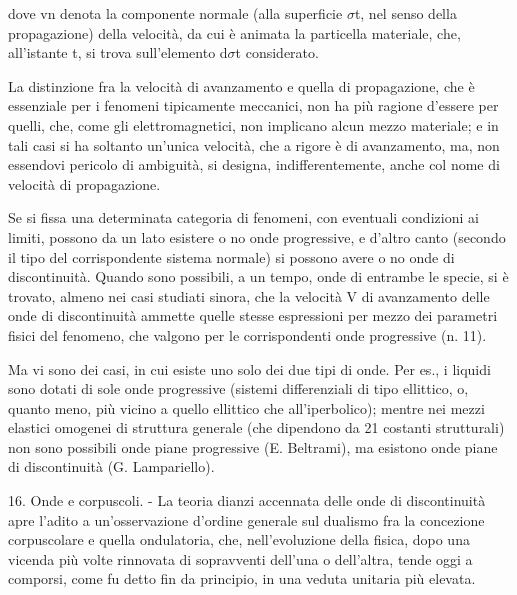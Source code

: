 \documentclass[a4paper]{article}
\begin{document}
dove vn denota la componente normale (alla superficie $\sigma$t, nel senso della propagazione) della velocità, da cui è animata la particella materiale, che, all'istante t, si trova sull'elemento d$\sigma$t considerato.

La distinzione fra la velocità di avanzamento e quella di propagazione, che è essenziale per i fenomeni tipicamente meccanici, non ha più ragione d'essere per quelli, che, come gli elettromagnetici, non implicano alcun mezzo materiale; e in tali casi si ha soltanto un'unica velocità, che a rigore è di avanzamento, ma, non essendovi pericolo di ambiguità, si designa, indifferentemente, anche col nome di velocità di propagazione.

Se si fissa una determinata categoria di fenomeni, con eventuali condizioni ai limiti, possono da un lato esistere o no onde progressive, e d'altro canto (secondo il tipo del corrispondente sistema normale) si possono avere o no onde di discontinuità. Quando sono possibili, a un tempo, onde di entrambe le specie, si è trovato, almeno nei casi studiati sinora, che la velocità V di avanzamento delle onde di discontinuità ammette quelle stesse espressioni per mezzo dei parametri fisici del fenomeno, che valgono per le corrispondenti onde progressive (n. 11).

Ma vi sono dei casi, in cui esiste uno solo dei due tipi di onde. Per es., i liquidi sono dotati di sole onde progressive (sistemi differenziali di tipo ellittico, o, quanto meno, più vicino a quello ellittico che all'iperbolico); mentre nei mezzi elastici omogenei di struttura generale (che dipendono da 21 costanti strutturali) non sono possibili onde piane progressive (E. Beltrami), ma esistono onde piane di discontinuità (G. Lampariello).

16. Onde e corpuscoli. - La teoria dianzi accennata delle onde di discontinuità apre l'adito a un'osservazione d'ordine generale sul dualismo fra la concezione corpuscolare e quella ondulatoria, che, nell'evoluzione della fisica, dopo una vicenda più volte rinnovata di sopravventi dell'una o dell'altra, tende oggi a comporsi, come fu detto fin da principio, in una veduta unitaria più elevata.
\end{document}
